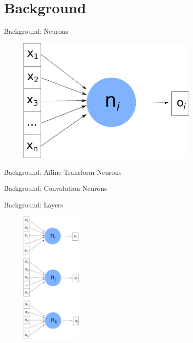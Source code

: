 \documentclass{beamer}
\begin{document}
\section{Background}

\begin{frame}{Background: Neurons}

\begin{figure}
    \centering
    \includegraphics[width=0.8\textwidth]{images/neuron.pdf}
\end{figure}

\end{frame}


\begin{frame}{Background: Affine Transform Neurons}



\end{frame}

\begin{frame}{Background: Convolution Neurons}
\centering
{}
\end{frame}

\begin{frame}{Background: Layers}

\begin{figure}
    \includegraphics[width=3cm]{images/layer.pdf}
\end{figure}

\end{frame}
\end{document}
